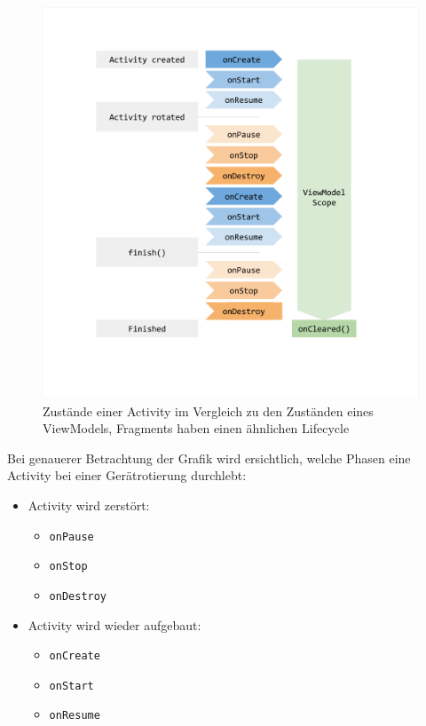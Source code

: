 \begin{figure}
\centering
\includegraphics{josip-pics/viewmodel-lifecycle.png}
\caption{Zustände einer Activity im Vergleich zu den Zuständen eines
ViewModels, Fragments haben einen ähnlichen Lifecycle
\cite{fragment-lifecycle} \cite{viewmodel}}
\end{figure}

Bei genauerer Betrachtung der Grafik wird ersichtlich, welche Phasen
eine Activity bei einer Gerätrotierung durchlebt:

\begin{itemize}
\tightlist
\item
  Activity wird zerstört:

  \begin{itemize}
  \tightlist
  \item
    \texttt{onPause}
  \item
    \texttt{onStop}
  \item
    \texttt{onDestroy}
  \end{itemize}
\item
  Activity wird wieder aufgebaut:

  \begin{itemize}
  \tightlist
  \item
    \texttt{onCreate}
  \item
    \texttt{onStart}
  \item
    \texttt{onResume}
  \end{itemize}
\end{itemize}

